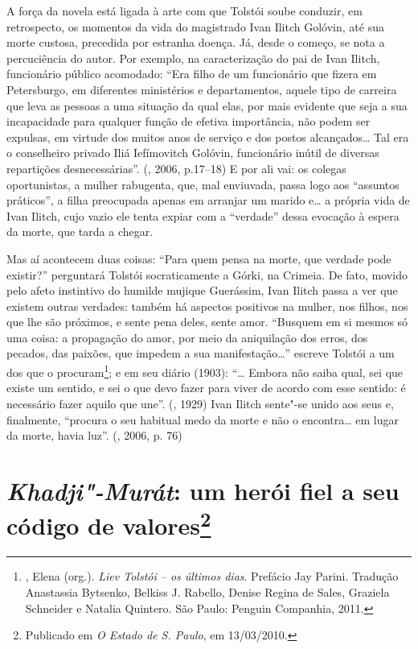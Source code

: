 A força da novela está ligada à arte com que
Tolstói soube conduzir, em retrospecto, os momentos da vida do
magistrado Ivan Ilitch Golóvin, até sua morte custosa, precedida
por estranha doença. Já, desde o começo, se nota a percuciência
do autor. Por exemplo, na caracterização do pai de Ivan Ilitch,
funcionário público acomodado: ``Era filho de um funcionário que
fizera em Petersburgo, em
diferentes ministérios e departamentos, aquele tipo de
carreira que leva as pessoas a uma situação da qual elas,
por mais evidente que seja a sua incapacidade para qualquer
função de efetiva importância, não podem ser expulsas, em
virtude dos muitos anos de serviço e dos postos alcançados\ldots{}
Tal era o conselheiro privado Iliá Iefímovitch Golóvin,
funcionário inútil de diversas repartições  desnecessárias''.
(, 2006, p.17--18) E por ali vai: os colegas
oportunistas, a mulher rabugenta, que, mal enviuvada, passa
logo aos ``assuntos práticos'', a filha preocupada apenas em
arranjar um marido e\ldots{} a própria vida de Ivan Ilitch,
cujo vazio ele tenta expiar com a ``verdade'' dessa evocação
à espera da morte, que tarda a chegar. 

Mas aí acontecem duas coisas: ``Para quem pensa na morte, que
verdade pode existir?'' perguntará Tolstói socraticamente a
Górki, na Crimeia. De fato, movido pelo afeto instintivo do
humilde mujique Guerássim, Ivan Ilitch passa a ver que
existem outras verdades: também há aspectos positivos na
mulher, nos filhos, nos que lhe são próximos, e sente pena
deles, sente amor. ``Busquem em si mesmos só uma coisa: a
propagação do amor, por meio da aniquilação dos erros, dos
pecados, das paixões, que impedem a sua manifestação\ldots{}''
escreve Tolstói a um dos que o
procuram\footnote{, Elena (org.). \emph{Liev
Tolstói -- os últimos dias}. Prefácio Jay Parini. Tradução
Anastassia Bytsenko, Belkiss J. Rabello, Denise Regina de
Sales, Graziela Schneider e Natalia Quintero. São Paulo:
Penguin Companhia, 2011.}; e em seu diário (1903): ``\ldots{}
Embora não saiba qual, sei que existe um sentido, e sei o que
devo fazer para viver de acordo com esse sentido: é necessário
fazer aquilo que une''. (, 1929) Ivan Ilitch
sente"-se unido aos seus e, finalmente, ``procura o seu habitual
medo da morte e não o encontra\ldots{} em lugar da morte, havia
luz''. (, 2006, p. 76)

\chapter{\emph{Khadji"-Murát}: um herói fiel a seu código de
valores\footnote{Publicado em \emph{O Estado de S. Paulo}, em
  13/03/2010.}}

